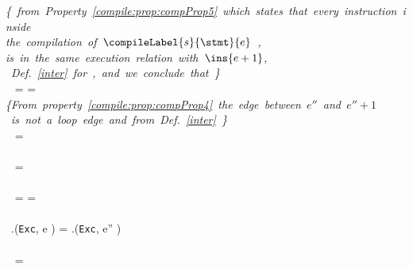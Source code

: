 \begin{itemize}
				
                               	
				\mbox{\rm\textit{\{ from Property \ref{compile:prop:compProp5} which states that every instruction inside }} \\
				\mbox{\rm\textit{the compilation of $\compileLabel{s}{\stmt}{e}$ , }} \\
                        	\mbox{\rm\textit{is in the same execution relation with $\ins{e+1}$, }} \\

			        \mbox{\rm\textit{    Def. \ref{inter} for \interOnly,  and    we conclude that \} } }\\
				  \  =  = \psi\\
				\mbox{\rm\textit{\{From property \ref{compile:prop:compProp4} the edge between  $e''$ and $e'' + 1$}}\\
				\mbox{\rm\textit{ is not a loop edge and from Def. \ref{inter} \}  }} \\
				 \  =  \\
				\mbox{\rm {}}\\
				  \  =  \\
				\mbox{\rm {}}	\\
					\   = 	= \psi	\\
				

				

				\mbox{\rm{} } \\
                               
                                  \ \methodd.\excPost(\mbox{\rm\texttt{Exc}}, e ) =  \methodd.\excPost(\mbox{\rm\texttt{Exc}}, e'' )  \\
				\mbox{\rm{} }\\ 
				 \	 =  \\


\end{itemize}
